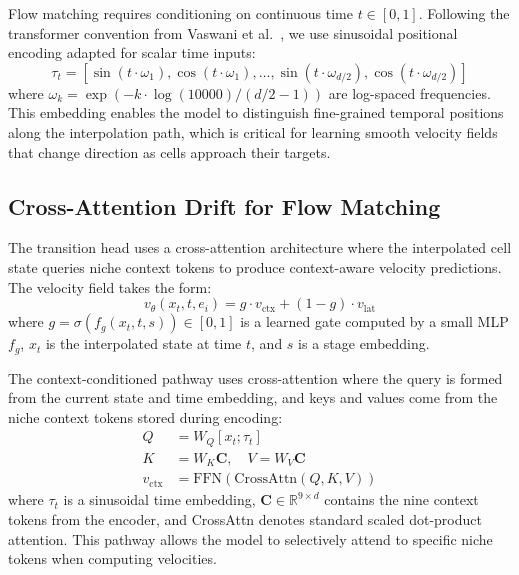 \documentclass[conference]{IEEEtran}
\begin{document}
Flow matching requires conditioning on continuous time $t \in [0,1]$. Following the transformer convention from Vaswani et al.\ \cite{Vaswani2017-rb}, we use sinusoidal positional encoding adapted for scalar time inputs:
\begin{equation}
\tau_t = \left[\sin(t \cdot \omega_1), \cos(t \cdot \omega_1), \ldots, \sin(t \cdot \omega_{d/2}), \cos(t \cdot \omega_{d/2})\right]
\label{eq:time_emb}
\end{equation}
where $\omega_k = \exp(-k \cdot \log(10000) / (d/2 - 1))$ are log-spaced frequencies. This embedding enables the model to distinguish fine-grained temporal positions along the interpolation path, which is critical for learning smooth velocity fields that change direction as cells approach their targets.

\subsection{Cross-Attention Drift for Flow Matching}

The transition head uses a cross-attention architecture where the interpolated cell state queries niche context tokens to produce context-aware velocity predictions. The velocity field takes the form:
\begin{equation}
v_\theta(x_t, t, e_i) = g \cdot v_{\text{ctx}} + (1-g) \cdot v_{\text{lat}}
\label{eq:drift}
\end{equation}
where $g = \sigma(f_g(x_t, t, s)) \in [0,1]$ is a learned gate computed by a small MLP $f_g$, $x_t$ is the interpolated state at time $t$, and $s$ is a stage embedding.

The context-conditioned pathway uses cross-attention where the query is formed from the current state and time embedding, and keys and values come from the niche context tokens stored during encoding:
\begin{align}
Q &= W_Q [x_t; \tau_t] \label{eq:drift_q} \\
K &= W_K \mathbf{C}, \quad V = W_V \mathbf{C} \label{eq:drift_kv} \\
v_{\text{ctx}} &= \text{FFN}(\text{CrossAttn}(Q, K, V)) \label{eq:drift_ctx}
\end{align}
where $\tau_t$ is a sinusoidal time embedding, $\mathbf{C} \in \mathbb{R}^{9 \times d}$ contains the nine context tokens from the encoder, and CrossAttn denotes standard scaled dot-product attention. This pathway allows the model to selectively attend to specific niche tokens when computing velocities.
\end{document}
